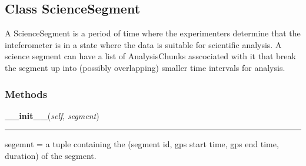 

\subsection{Class ScienceSegment}

    \label{pipeline:ScienceSegment}
A ScienceSegment is a period of time where the experimenters determine 
that the inteferometer is in a state where the data is suitable for 
scientific analysis. A science segment can have a list of AnalysisChunks 
asscociated with it that break the segment up into (possibly overlapping) 
smaller time intervals for analysis.



  \subsubsection{Methods}

    \label{pipeline:ScienceSegment:__init__}
    \vspace{0.5ex}

    \noindent\begin{boxedminipage}{\textwidth}

    \raggedright \textbf{\_\_init\_\_}(\textit{self}, \textit{segment})

    \vspace{-1.5ex}

    \rule{\textwidth}{0.5\fboxrule}
    segemnt = a tuple containing the (segment id, gps start time, gps end 
    time, duration) of the segment.

    \vspace{1ex}

    \end{boxedminipage}

    \label{pipeline:ScienceSegment:__getitem__}
    \vspace{0.5ex}

